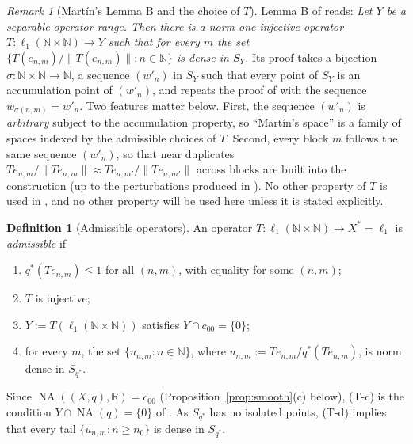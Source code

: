 \documentclass[10pt]{amsart}
\theoremstyle{definition}
\newtheorem{definition}[theorem]{Definition}
\theoremstyle{remark}
\newtheorem{remark}[theorem]{Remark}
\newcommand{\NA}{\operatorname{NA}}
\newcommand{\R}{\mathbb R}
\newcommand{\N}{\mathbb N}
\begin{document}
\begin{remark}[Mart\'in's Lemma B and the choice of $T$]\label{rem:lemmaB}
Lemma B of \cite{Martin} reads: \emph{Let $Y$ be a separable operator
range.  Then there is a norm-one injective operator
$T:\ell_1(\N\times\N)\to Y$ such that for every $m$ the set
$\{T(e_{n,m})/\|T(e_{n,m})\|:n\in\N\}$ is dense in $S_Y$.}
Its proof takes a bijection $\sigma:\N\times\N\to\N$, a sequence
$(w'_n)$ in $S_Y$ such that every point of $S_Y$ is an accumulation point
of $(w'_n)$, and repeats the proof of \cite[Proposition~2.8]{KLMW20} with
the sequence $w_{\sigma(n,m)}=w'_n$.  Two features matter below.  First,
the sequence $(w'_n)$ is \emph{arbitrary} subject to the accumulation
property, so ``Mart\'in's space'' is a family of spaces indexed by the
admissible choices of $T$.  Second, every block $m$ follows the same
sequence $(w'_n)$, so that near duplicates $Te_{n,m}/\|Te_{n,m}\|\approx
Te_{n,m'}/\|Te_{n,m'}\|$ across blocks are built into the construction (up
to the perturbations produced in \cite{KLMW20}).  No other property of $T$
is used in \cite{Martin}, and no other property will be used here unless
it is stated explicitly.
\end{remark}

\begin{definition}[Admissible operators]\label{def:admissible}
An operator $T:\ell_1(\N\times\N)\to X^*=\ell_1$ is \emph{admissible} if
\begin{enumerate}
\item[(T-a)] $q^*(Te_{n,m})\le1$ for all $(n,m)$, with equality for some
$(n,m)$;
\item[(T-b)] $T$ is injective;
\item[(T-c)] $Y:=T(\ell_1(\N\times\N))$ satisfies $Y\cap c_{00}=\{0\}$;
\item[(T-d)] for every $m$, the set $\{u_{n,m}:n\in\N\}$, where
$u_{n,m}:=Te_{n,m}/q^*(Te_{n,m})$, is norm dense in $S_{q^*}$.
\end{enumerate}
\end{definition}

Since $\NA((X,q),\R)=c_{00}$ (Proposition~\ref{prop:smooth}(c) below),
(T-c) is the condition $Y\cap\NA(q)=\{0\}$ of \cite{Martin}.  As $S_{q^*}$
has no isolated points, (T-d) implies that every tail
$\{u_{n,m}:n\geq n_0\}$ is dense in $S_{q^*}$.
\end{document}
